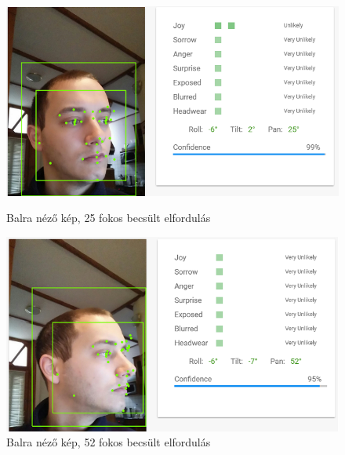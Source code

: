 \begin{figure}[h]
 \begin{minipage}{.5\textwidth} 
\centering
    \includegraphics[scale=0.3]{img/cloud_vision_left}
    \caption{Balra néző kép, 25 fokos becsült elfordulás}
 \end{minipage}
 \begin{minipage}{.5\textwidth} 
\centering
     \includegraphics[scale=0.3]{img/cloud_vision_very_left}
     \caption{Balra néző kép, 52 fokos becsült elfordulás}
 \end{minipage}
\end{figure}

